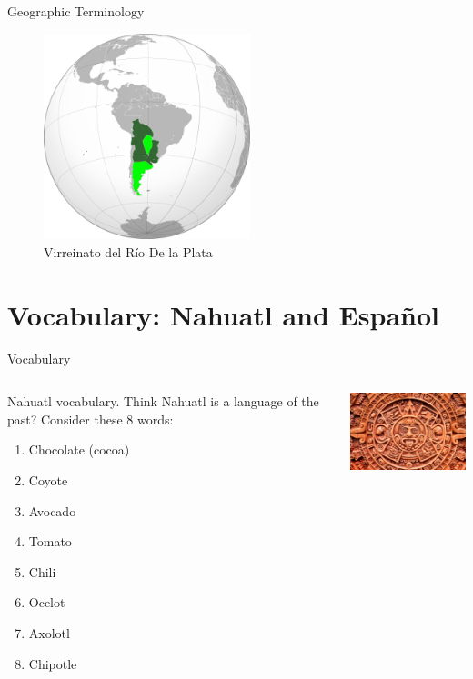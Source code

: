 \documentclass{beamer}
\begin{document}
\begin{frame}{Geographic Terminology}
\begin{figure}
\includegraphics[width=6cm]{figures/vice_riodelaplata.png}
\caption{Virreinato del R\'{i}o De la Plata}
\end{figure}
\end{frame}

\section{Vocabulary: Nahuatl and Espa\~{n}ol}

\begin{frame}{Vocabulary}
\small
\begin{columns}[T]
\begin{column}{0.5\textwidth}
Nahuatl vocabulary.  Think Nahuatl is a language of the past?  Consider these 8 words:
\begin{enumerate}
\item Chocolate (cocoa)
\item Coyote
\item Avocado
\item Tomato
\item Chili
\item Ocelot
\item Axolotl
\item Chipotle
\end{enumerate}
\end{column}
\begin{column}{0.5\textwidth}
\includegraphics[width=5cm]{figures/aztec.jpg}
\end{column}
\end{columns}

\end{frame}
\end{document}
